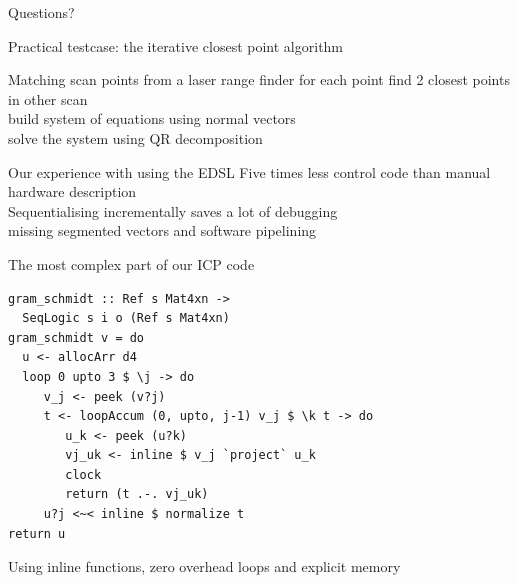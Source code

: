 \documentclass[pdf]{beamer}
\begin{document}
\begin{frame}
\Huge{\centerline{Questions?}}
\end{frame}

\begin{frame}{Practical testcase: the iterative closest point algorithm}
\begin{block}{Matching scan points from a laser range finder}
for each point find 2 closest points in other scan \\
build system of equations using normal vectors \\ 
solve the system using QR decomposition
\end{block}

\begin{block}{Our experience with using the EDSL}
Five times less control code than manual hardware description \\
Sequentialising incrementally saves a lot of debugging \\
missing segmented vectors and software pipelining
\end{block}

\end{frame}


\begin{frame}[fragile]{The most complex part of our ICP code}
\begin{block}{}
\begin{verbatim}
gram_schmidt :: Ref s Mat4xn -> 
  SeqLogic s i o (Ref s Mat4xn)
gram_schmidt v = do
  u <- allocArr d4
  loop 0 upto 3 $ \j -> do
     v_j <- peek (v?j)
     t <- loopAccum (0, upto, j-1) v_j $ \k t -> do
        u_k <- peek (u?k)
        vj_uk <- inline $ v_j `project` u_k
        clock
        return (t .-. vj_uk)
     u?j <~< inline $ normalize t
return u
\end{verbatim}
\end{block}

\begin{block}{}
Using inline functions, zero overhead loops and explicit memory
\end{block}

\end{frame}
\end{document}
